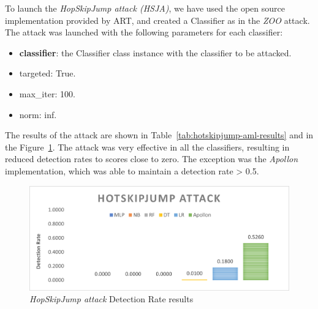 To launch the \textit{HopSkipJump attack (HSJA)}, we have used the open source implementation provided by ART, and created a Classifier
as in the \textit{ZOO} attack.
The attack was launched with the following parameters for each classifier:

\begin{itemize}
    \item \textbf{classifier}: the Classifier class instance with the classifier to be attacked.
    \item targeted: True.
    \item max\_iter: 100.
    \item norm: inf.
\end{itemize}


The results of the attack are shown in Table~\ref{tab:hotskipjump-aml-results} and in the Figure~\ref{fig:hopskipjump-aml-results}.
The attack was very effective in all the classifiers, resulting in reduced detection rates to scores close to zero.
The exception was the \textit{Apollon} implementation, which was able to maintain a detection rate > 0.5.

\begin{table}
    \centering
    \caption{Results of the \textit{HopSkipJump} AML attack}
    \label{tab:hotskipjump-aml-results}
\end{table}

\begin{figure}
    \centering
    \includegraphics[width=0.9\columnwidth]{HSJA.png}
    \caption{\textit{HopSkipJump attack} Detection Rate results}
    \label{fig:hopskipjump-aml-results}
\end{figure}


